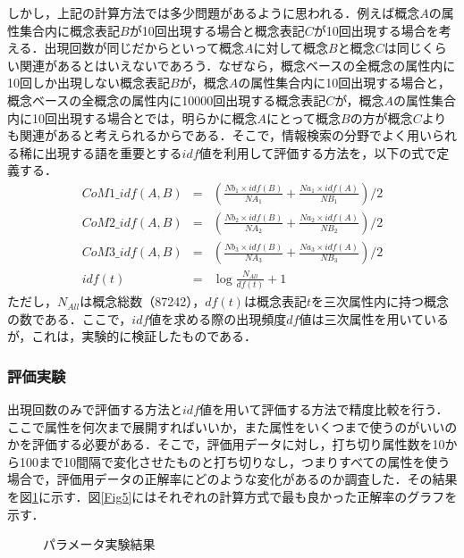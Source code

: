 しかし，上記の計算方法では多少問題があるように思われる．例えば概念$A$の属性集合内に概念表記$B$が10回出現する場合と概念表記$C$が10回出現する場合を考える．出現回数が同じだからといって概念$A$に対して概念$B$と概念$C$は同じくらい関連があるとはいえないであろう．なぜなら，概念ベースの全概念の属性内に10回しか出現しない概念表記$B$が，概念$A$の属性集合内に10回出現する場合と，概念ベースの全概念の属性内に10000回出現する概念表記$C$が，概念$A$の属性集合内に10回出現する場合とでは，明らかに概念$A$にとって概念$B$の方が概念$C$よりも関連があると考えられるからである．そこで，情報検索の分野でよく用いられる稀に出現する語を重要とする$idf$値を利用して評価する方法を，以下の式で定義する．
\begin{eqnarray}
CoM1\_idf(A,B) &=& \left(\frac{Nb_1 \times idf(B)}{NA_1} 
                       + \frac{Na_1 \times idf(A)}{NB_1} \right) / 2 \\
CoM2\_idf(A,B) &=& \left(\frac{Nb_2 \times idf(B)}{NA_2} 
                       + \frac{Na_2 \times idf(A)}{NB_2} \right) / 2 \\
CoM3\_idf(A,B) &=& \left(\frac{Nb_3 \times idf(B)}{NA_3} 
                       + \frac{Na_3 \times idf(A)}{NB_3} \right) / 2 \\
idf(t) &=& \log \frac{N_{All}}{df(t)} + 1
\end{eqnarray}
ただし，$N_{All}$は概念総数（87242），$df(t)$は概念表記$t$を三次属性内に持つ概念の数である．ここで，$idf$値を求める際の出現頻度$df$値は三次属性を用いているが，これは，実験的に検証した\cite{Sakata}ものである．

\subsubsection{評価実験}

出現回数のみで評価する方法と$idf$値を用いて評価する方法で精度比較を行う．ここで属性を何次まで展開すればいいか，また属性をいくつまで使うのがいいのかを評価する必要がある．そこで，評価用データに対し，打ち切り属性数を10から100まで10間隔で変化させたものと打ち切りなし，つまりすべての属性を使う場合で，評価用データの正解率にどのような変化があるのか調査した．その結果を図\ref{Fig4}に示す．図\ref{Fig5}にはそれぞれの計算方式で最も良かった正解率のグラフを示す．

\begin{figure}[tb]
\begin{center}
\end{center}
\caption{パラメータ実験結果}
\label{Fig4}
\end{figure}


